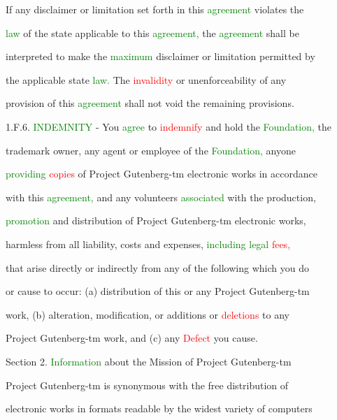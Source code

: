  If any disclaimer or limitation set forth in this \textcolor{green}{agreement} violates the

 \textcolor{green}{law} of the state applicable to this \textcolor{green}{agreement,} the \textcolor{green}{agreement} shall be

 interpreted to make the \textcolor{green}{maximum} disclaimer or limitation permitted by

 the applicable state \textcolor{green}{law.} The \textcolor{red}{invalidity} or unenforceability of any

 provision of this \textcolor{green}{agreement} shall not void the remaining provisions.



 1.F.6. \textcolor{green}{INDEMNITY} - You \textcolor{green}{agree} to \textcolor{red}{indemnify} and hold the \textcolor{green}{Foundation,} the

 trademark owner, any agent or employee of the \textcolor{green}{Foundation,} anyone

 \textcolor{green}{providing} \textcolor{red}{copies} of Project Gutenberg-tm electronic works in accordance

 with this \textcolor{green}{agreement,} and any \textcolor{BurntOrange}{volunteers} \textcolor{green}{associated} with the \textcolor{BurntOrange}{production,}

 \textcolor{green}{promotion} and distribution of Project Gutenberg-tm electronic works,

 harmless from all liability, costs and expenses, \textcolor{green}{including} \textcolor{green}{legal} \textcolor{red}{fees,}

 that arise directly or indirectly from any of the following which you do

 or cause to occur: (a) distribution of this or any Project Gutenberg-tm

 work, (b) alteration, modification, or additions or \textcolor{red}{deletions} to any

 Project Gutenberg-tm work, and (c) any \textcolor{red}{Defect} you cause.





 Section 2. \textcolor{green}{Information} about the Mission of Project Gutenberg-tm



 Project Gutenberg-tm is \textcolor{BurntOrange}{synonymous} with the free distribution of

 electronic works in formats readable by the widest variety of computers

